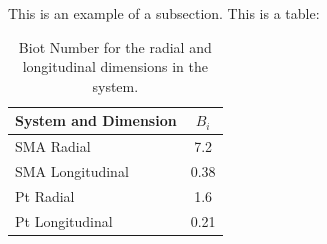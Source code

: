 This is an example of a subsection. This is a table:


\begin{table}[t] \centering
\begin{tabular}{@{}lc@{}}
\toprule
System and Dimension       & ${B_{i}}$ \\ \midrule
SMA Radial       & 7.2    \\
SMA Longitudinal  & 0.38    \\
Pt Radial         & 1.6    \\
Pt Longitudinal  & 0.21    \\ \bottomrule
\end{tabular}
\caption{{Biot Number for the radial and longitudinal dimensions in the system.}}
\label{tab:Biot Summary}
\end{table}


